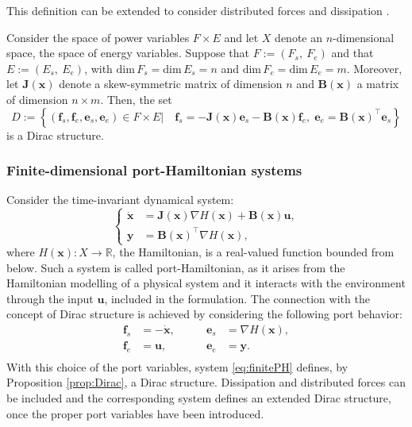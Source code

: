This definition can be extended to consider distributed forces and dissipation \cite{villegas2007}.
\begin{proposition}
	\label{prop:Dirac}
	Consider the space of power variables ${F} \times {E}$ and let ${X}$ denote an $n$-dimensional space, the space of energy variables. Suppose that ${F} := ({F}_s, \ {F}_e )$ and that ${E} := ({E}_s,  \ {E}_e )$, with $\text{dim} \, {F}_s = \text{dim} \, {E}_s = n$ and $\text{dim} \, {F}_e = \text{dim} \, {E}_e = m$. Moreover, let $\mathbf{J}(\mathbf{x})$ denote
	a skew-symmetric matrix of dimension $n$ and $\mathbf{B}(\mathbf{x})$ a matrix of dimension $n \times m$. Then, the set
	\begin{equation}
	{D} := \left\{ (\mathbf{f}_s, \mathbf{f}_e , \mathbf{e}_s ,\mathbf{e}_e ) \in {F} \times {E} \vert \quad \mathbf{f}_s = - \mathbf{J}(\mathbf{x}) \mathbf{e}_s - \mathbf{B}(\mathbf{x}) \mathbf{f}_e, \; \mathbf{e}_e = \mathbf{B}(\mathbf{x})^\top \mathbf{e}_s \right\}
	\end{equation}
	is a Dirac structure.
\end{proposition}

\subsubsection{Finite-dimensional port-Hamiltonian systems}
Consider the time-invariant dynamical system:
\begin{equation}
\label{eq:finitePH}
\begin{cases}
\dot{ \mathbf{x} } &= \mathbf{J}(\mathbf{x}) \nabla H(\mathbf{x}) + \mathbf{B}(\mathbf{x})\mathbf{u}, \\
\mathbf{y} &= \mathbf{B}(\mathbf{x})^\top \nabla H(\mathbf{x}),
\end{cases}
\end{equation}
where $ H(\mathbf{x}) : X \rightarrow \mathbb{R} $, the Hamiltonian, is a real-valued function bounded from below. Such a system is called port-Hamiltonian, as it arises from the Hamiltonian modelling of a physical system and it interacts with the environment through the input $\mathbf{u}$, included in the formulation. The connection with the concept of Dirac structure is achieved by considering the following port behavior:
\begin{equation}
\begin{aligned}
\mathbf{f}_s &= - \dot{\mathbf{x}}, \qquad 
&\mathbf{e}_s &= \nabla{H}(\mathbf{x}), \\
\mathbf{f}_e &= \mathbf{u}, \qquad
&\mathbf{e}_e &= \mathbf{y}. \\
\end{aligned}
\end{equation}
With this choice of the port variables, system \eqref{eq:finitePH} defines, by Proposition \ref{prop:Dirac}, a Dirac structure. Dissipation and distributed forces can be included and the corresponding system defines an extended Dirac structure, once the proper port variables have been introduced.

